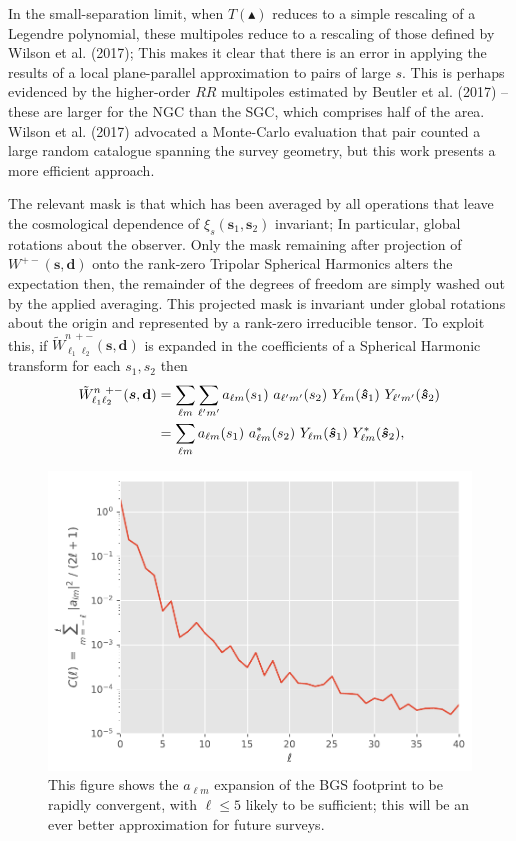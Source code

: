 \documentclass[useAMS,usenatbib]{mn2e}
\newcommand{\vb}[1]{\mathbf{#1}}
\begin{document}
In the small-separation limit, when $T(\blacktriangle)$ reduces to a simple rescaling of a Legendre polynomial, these multipoles reduce to a rescaling of those defined by Wilson et al. (2017); This makes it clear that there is an error in applying the results of a local plane-parallel approximation to pairs of large $s$.  This is perhaps evidenced by the higher-order $RR$ multipoles estimated by Beutler et al. (2017) -- these are larger for the NGC than the SGC, which comprises half of the area.  Wilson et al. (2017) advocated  a Monte-Carlo evaluation that pair counted a large random catalogue spanning the survey geometry, but this work presents a more efficient approach.  

The relevant mask is that which has been averaged by all operations that leave the cosmological dependence of $\xi_s(\boldsymbol s_1, \boldsymbol s_2)$ invariant;  In particular, global rotations about the observer.  Only the mask remaining after projection of $W^{+-}(\boldsymbol{s}, \vb{d})$ onto the rank-zero Tripolar Spherical Harmonics alters the expectation then, the remainder of the degrees of freedom are simply washed out by the applied averaging.  This projected mask is invariant under global rotations about the origin and represented by a rank-zero irreducible tensor.  To exploit this, if $\tilde W^{n \ +-}_{\ell_1 \ell_2}(\boldsymbol{s}, \vb{d})$ is expanded in the coefficients of a Spherical Harmonic transform for each $s_1, s_2$ then 
\begin{align}
\tilde W^{n \ +-}_{\ell_1 \ell_2}(\boldsymbol{s}, \vb{d}) &= \sum_{\ell m} \sum_{\ell' m'} a_{\ell m}(s_1) \ a_{\ell' m'}(s_2) \ Y_{\ell m}(\boldsymbol {\hat s}_1) \ Y_{\ell' m'}(\boldsymbol {\hat s}_2) \notag \\ 
& = \sum_{\ell m} a_{\ell m}(s_1) \ a^{*}_{\ell m}(s_2) \ Y_{\ell m}(\boldsymbol {\hat s}_1) \ Y^{*}_{\ell m}(\boldsymbol {\hat s}_2),
\end{align}
\begin{figure}
    \centering
    \includegraphics[scale=0.5]{desi_Cls.pdf}
    \caption{This figure shows the $a_{\ell m }$ expansion of the BGS footprint to be rapidly convergent, with $\ell \leq 5$ likely to be sufficient; this will be an ever better approximation for future surveys.}
    \label{fig:Cls}
\end{figure}
\end{document}
